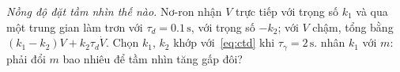 \begin{exercise}[\lvlC]
\label{ex:05:8}
\emph{Nồng độ đặt tầm nhìn thế nào.} Nơ-ron  nhận $V$ trực tiếp với trọng số $k_1$ và qua một trung gian  làm trơn với $\tau_d=0.1\,\text{s}$, với trọng số $-k_2$; với $V$ chậm, tổng bằng $(k_1-k_2)V+k_2\tau_d\dot V$. Chọn $k_1$, $k_2$ khớp với~\eqref{eq:ctd} khi $\tau_\gamma=2\,\text{s}$.  nhân $k_1$ với $m$: phải đổi $m$ bao nhiêu để tầm nhìn tăng gấp đôi?
\end{exercise}
